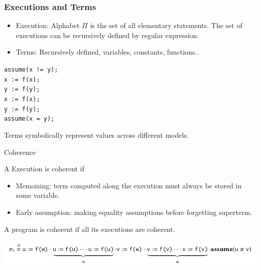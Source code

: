 \documentclass[aspectratio=1610, 13pt]{beamer}
\begin{document}
\begin{frame}\frametitle{Executions and Terms}

\begin{itemize}
\item Execution: Alphabet $\Pi$ is the set of all elementary statements. The set of executions can be recursively defined by regular expression.

\item Terms: Recursively defined, variables, constants, functions..
\end{itemize}
\begin{example}
\begin{center}

\texttt{assume(x != y); \\x := f(x);\\ y := f(y);\\ x := f(x); \\y := f(y); \\assume(x = y);}
\end{center}
\end{example}

Terms symbolically represent values across different models.


\end{frame}

\begin{frame}{Coherence}

\begin{definition}[Coherence]
A Execution is coherent if
\begin{itemize}
\item Memoizing: term computed along the execution must always be stored in some variable.
\item Early assumption: making equality assumptions before forgetting superterm.
\end{itemize}

A program is coherent if all its executions are coherent.
\end{definition}

\begin{example}

\begin{center}
\includegraphics[scale=0.4]{coherent_exp.png}
\end{center}
\end{example}

\end{frame}
\end{document}
